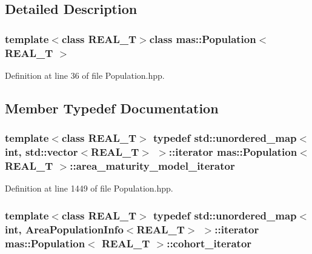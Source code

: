 \subsection{Detailed Description}
\subsubsection*{template$<$class R\-E\-A\-L\-\_\-\-T$>$class mas\-::\-Population$<$ R\-E\-A\-L\-\_\-\-T $>$}



Definition at line 36 of file Population.\-hpp.



\subsection{Member Typedef Documentation}
\hypertarget{classmas_1_1_population_a6c5591e255cb99b132de23c5c2a6dbaa}{
\subsubsection[{area\-\_\-maturity\-\_\-model\-\_\-iterator}]{\setlength{\rightskip}{0pt plus 5cm}template$<$class R\-E\-A\-L\-\_\-\-T$>$ typedef std\-::unordered\-\_\-map$<$int, std\-::vector$<$R\-E\-A\-L\-\_\-\-T$>$ $>$\-::iterator {\bf mas\-::\-Population}$<$ R\-E\-A\-L\-\_\-\-T $>$\-::{\bf area\-\_\-maturity\-\_\-model\-\_\-iterator}}}\label{classmas_1_1_population_a6c5591e255cb99b132de23c5c2a6dbaa}


Definition at line 1449 of file Population.\-hpp.

\hypertarget{classmas_1_1_population_a82c4fbea27716a8e9e64a34cf867ad43}{
\subsubsection[{cohort\-\_\-iterator}]{\setlength{\rightskip}{0pt plus 5cm}template$<$class R\-E\-A\-L\-\_\-\-T$>$ typedef std\-::unordered\-\_\-map$<$int, {\bf Area\-Population\-Info}$<$R\-E\-A\-L\-\_\-\-T$>$ $>$\-::iterator {\bf mas\-::\-Population}$<$ R\-E\-A\-L\-\_\-\-T $>$\-::{\bf cohort\-\_\-iterator}}}\label{classmas_1_1_population_a82c4fbea27716a8e9e64a34cf867ad43}


